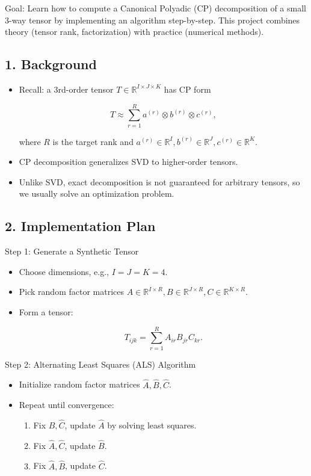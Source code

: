 \documentclass[
  letterpaper,
  DIV=11,
  numbers=noendperiod]{scrreprt}
\providecommand{\tightlist}{%
  \setlength{\itemsep}{0pt}\setlength{\parskip}{0pt}}
\begin{document}
Goal: Learn how to compute a Canonical Polyadic (CP) decomposition of a
small 3-way tensor by implementing an algorithm step-by-step. This
project combines theory (tensor rank, factorization) with practice
(numerical methods).

\subsection{1. Background}\label{background}

\begin{itemize}
\item
  Recall: a 3rd-order tensor \(T \in \mathbb{R}^{I \times J \times K}\)
  has CP form

  \[
  T \approx \sum_{r=1}^R a^{(r)} \otimes b^{(r)} \otimes c^{(r)},
  \]

  where \(R\) is the target rank and
  \(a^{(r)} \in \mathbb{R}^I, b^{(r)} \in \mathbb{R}^J, c^{(r)} \in \mathbb{R}^K\).
\item
  CP decomposition generalizes SVD to higher-order tensors.
\item
  Unlike SVD, exact decomposition is not guaranteed for arbitrary
  tensors, so we usually solve an optimization problem.
\end{itemize}

\subsection{2. Implementation Plan}\label{implementation-plan}

Step 1: Generate a Synthetic Tensor

\begin{itemize}
\item
  Choose dimensions, e.g., \(I=J=K=4\).
\item
  Pick random factor matrices
  \(A \in \mathbb{R}^{I \times R}, B \in \mathbb{R}^{J \times R}, C \in \mathbb{R}^{K \times R}\).
\item
  Form a tensor:

  \[
  T_{ijk} = \sum_{r=1}^R A_{ir} B_{jr} C_{kr}.
  \]
\end{itemize}

Step 2: Alternating Least Squares (ALS) Algorithm

\begin{itemize}
\item
  Initialize random factor matrices \(\hat{A}, \hat{B}, \hat{C}\).
\item
  Repeat until convergence:

  \begin{enumerate}
  \def\labelenumi{\arabic{enumi}.}
  \tightlist
  \item
    Fix \(\hat{B}, \hat{C}\), update \(\hat{A}\) by solving least
    squares.
  \item
    Fix \(\hat{A}, \hat{C}\), update \(\hat{B}\).
  \item
    Fix \(\hat{A}, \hat{B}\), update \(\hat{C}\).
  \end{enumerate}
\end{itemize}
\end{document}
